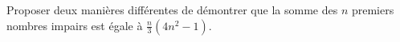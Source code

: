 %
%
	Proposer deux manières différentes de démontrer que la somme des $n$ premiers nombres impairs est égale à $\frac{n}{3}(4n^2-1)$.
